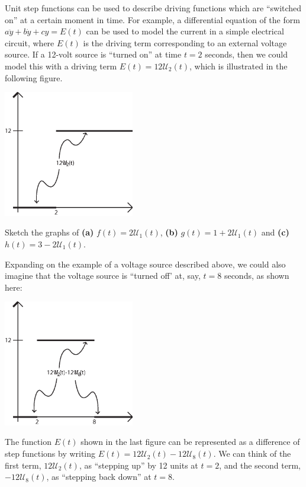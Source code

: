 {Unit step functions can be used to describe driving functions which are ``switched on'' at a certain moment in time.  For example, a differential equation of the form $a\ddot{y}+b\dot{y}+cy=E(t)$ can be used to model the current in a simple electrical circuit, where $E(t)$ is the driving term corresponding to an external voltage source.  If a 12-volt source is ``turned on'' at time $t=2$ seconds, then we could model this with a driving term $E(t)=12\mathcal{U}_2(t)$, which is illustrated in the following figure.
\begin{center}
\includegraphics[width=2.25in]{11-laplaceII/stepfunction1.eps}
\end{center}

\begin{exe} Sketch the graphs of {\bf (a)} $f(t) = 2\mathcal{U}_1(t)$, {\bf (b)} $g(t)= 1+2\mathcal{U}_1(t)$ and {\bf (c)} $h(t) = 3-2\mathcal{U}_1(t)$.  
\end{exe}

Expanding on the example of a voltage source described above, we could also imagine that the voltage source is ``turned off' at, say, $t=8$ seconds, as shown here:
\begin{center}
\includegraphics[width=2.25in]{11-laplaceII/stepfunction2.eps}
\end{center}
The function $E(t)$ shown in the last figure can be represented as a difference of step functions by writing $E(t) = 12 \mathcal{U}_2(t) - 12 \mathcal{U}_8(t)$.  We can think of the first term, $12 \mathcal{U}_2(t)$, as ``stepping up'' by 12 units at $t=2$, and the second term, $-12\mathcal{U}_8(t)$, as ``stepping back down'' at $t=8$.

}
